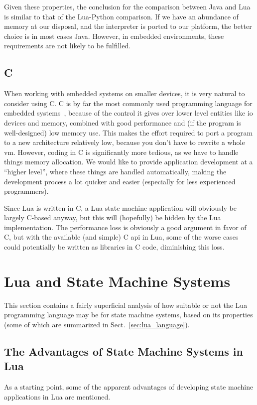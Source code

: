 \noindent
Given these properties, the conclusion for the comparison between Java and Lua is similar to that of the Lua-Python comparison. If we have an abundance of memory at our disposal, and the interpreter is ported to our platform, the better choice is in most cases Java. However, in embedded environments, these requirements are not likely to be fulfilled.

\subsection{C}
\label{sec:lua_vs_c}
When working with embedded systems on smaller devices, it is very natural to consider using C. C is by far the most commonly used programming language for embedded systems~\cite{phd:dunkels}, because of the control it gives over lower level entities like \gls{io} devices and memory, combined with good performance and (if the program is well-designed) low memory use. This makes the effort required to port a program to a new architecture relatively low, because you don't have to rewrite a whole \gls{vm}. However, coding in C is significantly more tedious, as we have to handle things memory allocation. We would like to provide application development at a ``higher level'', where these things are handled automatically, making the development process a lot quicker and easier (especially for less experienced programmers).

\noindent
Since Lua is written in C, a Lua state machine application will obviously be largely C-based anyway, but this will (hopefully) be hidden by the Lua implementation. The performance loss is obviously a good argument in favor of C, but with the available (and simple) C \gls{api} in Lua, some of the worse cases could potentially be written as libraries in C code, diminishing this loss.

\section{Lua and State Machine Systems}
\label{sec:lua_and_state_machines}
This section contains a fairly superficial analysis of how suitable or not the Lua programming language may be for state machine systems, based on its properties (some of which are summarized in Sect.~\ref{sec:lua_language}).

\subsection{The Advantages of State Machine Systems in Lua}
\label{sec:lua_advantages}
As a starting point, some of the apparent advantages of developing state machine applications in Lua are mentioned.

